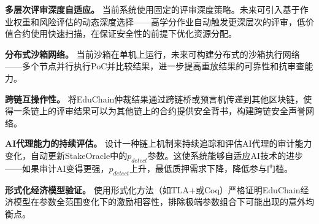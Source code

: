 \documentclass[10.5pt,compsoc]{CjC}
\begin{document}
\textbf{多层次评审深度自适应。} 当前系统使用固定的评审深度策略。未来可引入基于作业权重和风险评估的动态深度选择——高学分作业自动触发更深层次的评审，低价值合约使用快速扫描，在保证安全性的前提下优化资源分配。

\textbf{分布式沙箱网络。} 当前沙箱在单机上运行，未来可构建分布式的沙箱执行网络——多个节点并行执行PoC并比较结果，进一步提高重放结果的可靠性和抗审查能力。

\textbf{跨链互操作性。} 将EduChain仲裁结果通过跨链桥或预言机传递到其他区块链，使得一条链上的评审结果可以为其他链上的合约提供安全背书，构建跨链安全声誉网络。

\textbf{AI代理能力的持续评估。} 设计一种链上机制来持续追踪和评估AI代理的审计能力变化，自动更新StakeOracle中的$p_{detect}$参数。这使系统能够自适应AI技术的进步——如果审计AI变得更强，$p_{detect}$上升，最低质押需求下降，降低参与门槛。

\textbf{形式化经济模型验证。} 使用形式化方法（如TLA+或Coq）严格证明EduChain经济模型在参数全范围变化下的激励相容性，排除极端参数组合下可能出现的意外均衡点。
\end{document}
